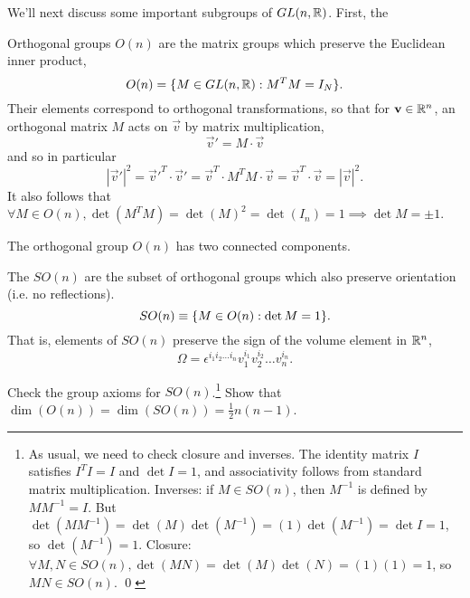 We'll next discuss some important subgroups of $GL(n,\mathbb{R})$. First, the 
\begin{defn}
Orthogonal groups $O(n)$ are the matrix groups which preserve the Euclidean inner product,
\begin{equation}
O(n)=\{M\in GL(n,\mathbb{R}): M^T M = I_N\}.
\end{equation}
Their elements correspond to orthogonal transformations, so that for $\boldsymbol{\mathbf{v}}\in \mathbb{R}^n$, an orthogonal matrix $M$ acts on $\vec{v}$ by matrix multiplication,
$$\vec{v}'=M\cdot \vec{v}$$
and so in particular
$$|\vec{v}'|^2={\vec{v}'}^T \cdot \vec{v}' = \vec{v}^T \cdot M^T M \cdot \vec{v}= \vec{v}^T \cdot \vec{v}=|\vec{v}|^2.$$
It also follows that $\forall M\in O(n), \det(M^TM)=\det(M)^2 = \det(I_n) = 1 \implies \det M =\pm 1$.
\end{defn}
The orthogonal group $O(n)$ has two connected components.
\begin{defn}
The  $SO(n)$ are the subset of orthogonal groups which also preserve orientation (i.e. no reflections).
$$SO(n)\equiv \{M\in O(n): \det M = 1\}.$$
That is, elements of $SO(n)$ preserve the sign of the volume element in $\mathbb{R}^n$,
$$\Omega= \epsilon^{i_1 i_2 \ldots i_n} v_1^{i_1}v_2^{i_2}\ldots v_n^{i_n}.$$
\end{defn}

\begin{ex}
Check the group axioms for $SO(n)$.\footnote{As usual, we need to check closure and inverses. The identity matrix $I$ satisfies $I^TI=I$ and $\det I=1$, and associativity follows from standard matrix multiplication. Inverses: if $M\in SO(n)$, then $M^{-1}$ is defined by $MM^{-1}=I$. But $\det(MM^{-1})=\det(M)\det(M^{-1})=(1)\det(M^{-1})=\det I = 1$, so $\det(M^{-1})=1$. Closure: $\forall M,N \in SO(n), \det(MN)=\det(M)\det(N)=(1)(1)=1$, so $MN\in SO(n)$. \qed} %
Show that $\dim(O(n))=\dim(SO(n))=\frac{1}{2} n(n-1)$.
\end{ex}